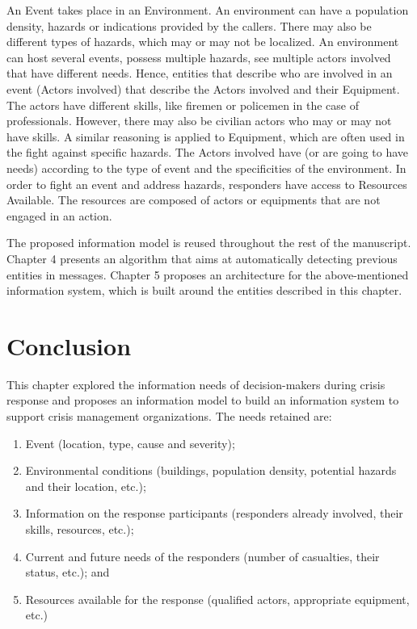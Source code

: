 An Event takes place in an Environment.
An environment can have a population density, hazards or indications provided by the callers.
There may also be different types of hazards, which may or may not be localized.
An environment can host several events, possess multiple hazards, see multiple actors involved
that have different needs.
Hence, entities that describe who are involved in an event (Actors involved) that describe the
Actors involved and their Equipment.
The actors have different skills, like firemen or policemen in the case of professionals.
However, there may also be civilian actors who may or may not have skills.
A similar reasoning is applied to Equipment, which are often used in the fight against specific hazards.
The Actors involved have (or are going to have needs) according to the type of event and the
specificities of the environment.
In order to fight an event and address hazards, responders have access to Resources Available.
The resources are composed of actors or equipments that are not engaged in an action.

The proposed information model is reused throughout the rest of the manuscript.
Chapter 4 presents an algorithm that aims at automatically detecting previous entities in messages.
Chapter 5 proposes an architecture for the above-mentioned information system, which is built around the entities described in this chapter.

\section*{Conclusion}
This chapter explored the information needs of decision-makers during crisis response and
proposes an information model to build an information system to support crisis management organizations.
The needs retained are:

\begin{enumerate}
    \item Event (location, type, cause and severity);
    \item Environmental conditions (buildings, population density, potential hazards and their location, etc.);
    \item Information on the response participants (responders already involved, their skills, resources, etc.);
    \item Current and future needs of the responders (number of casualties, their status, etc.); and
    \item Resources available for the response (qualified actors, appropriate equipment, etc.)
\end{enumerate}

